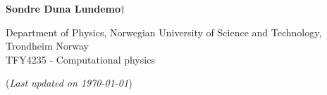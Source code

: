 


	
\begin{titlepage}
	\begin{center}
	\setlength{\parskip}{0em}
	\thispagestyle{titlepage}
	

	\vspace{4mm}
	
	\large{\textbf{Sondre Duna Lundemo}}$\dagger$
	
	\normalsize{Department of Physics, Norwegian University of Science and Technology, Trondheim Norway \\
	TFY4235 - Computational physics
	}

	(\textit{Last updated on \today})
	\end{center}

	\setlength{\parindent}{2em}
	
	\begin{figure}
		
	\end{figure}
	

\end{titlepage}

\newpage
\setlength{\parskip}{0em}
\tableofcontents
\setlength{\parskip}{1em}
\newpage






